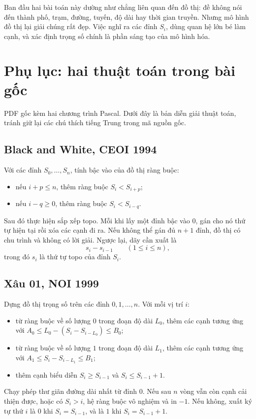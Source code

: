 \documentclass[11pt]{article}
\begin{document}
Ban đầu hai bài toán này dường như chẳng liên quan đến đồ thị: đề không nói
đến thành phố, trạm, đường, tuyến, độ dài hay thời gian truyền. Nhưng mô hình
đồ thị lại giải chúng rất đẹp. Việc nghĩ ra các đỉnh \(S_i\), dùng quan hệ lớn
bé làm cạnh, và xác định trọng số chính là phần sáng tạo của mô hình hóa.

\section{Phụ lục: hai thuật toán trong bài gốc}

PDF gốc kèm hai chương trình Pascal. Dưới đây là bản diễn giải thuật toán,
tránh giữ lại các chú thích tiếng Trung trong mã nguồn gốc.

\subsection{Black and White, CEOI 1994}

Với các đỉnh \(S_0,\ldots,S_n\), tính bậc vào của đồ thị ràng buộc:
\begin{itemize}
  \item nếu \(i+p\le n\), thêm ràng buộc \(S_i<S_{i+p}\);
  \item nếu \(i-q\ge 0\), thêm ràng buộc \(S_i<S_{i-q}\).
\end{itemize}
Sau đó thực hiện sắp xếp topo. Mỗi khi lấy một đỉnh bậc vào \(0\), gán cho nó
thứ tự hiện tại rồi xóa các cạnh đi ra. Nếu không thể gán đủ \(n+1\) đỉnh,
đồ thị có chu trình và không có lời giải. Ngược lại, dãy cần xuất là
\[
  s_i-s_{i-1}\qquad(1\le i\le n),
\]
trong đó \(s_i\) là thứ tự topo của đỉnh \(S_i\).

\subsection{Xâu 01, NOI 1999}

Dựng đồ thị trọng số trên các đỉnh \(0,1,\ldots,n\). Với mỗi vị trí \(i\):
\begin{itemize}
  \item từ ràng buộc về số lượng \(0\) trong đoạn độ dài \(L_0\), thêm các
  cạnh tương ứng với
  \(A_0\le L_0-(S_i-S_{i-L_0})\le B_0\);
  \item từ ràng buộc về số lượng \(1\) trong đoạn độ dài \(L_1\), thêm các
  cạnh tương ứng với
  \(A_1\le S_i-S_{i-L_1}\le B_1\);
  \item thêm cạnh biểu diễn \(S_i\ge S_{i-1}\) và \(S_i\le S_{i-1}+1\).
\end{itemize}
Chạy phép thư giãn đường dài nhất từ đỉnh \(0\). Nếu sau \(n\) vòng vẫn còn
cạnh cải thiện được, hoặc có \(S_i>i\), hệ ràng buộc vô nghiệm và in \(-1\).
Nếu không, xuất ký tự thứ \(i\) là \(0\) khi \(S_i=S_{i-1}\), và là \(1\) khi
\(S_i=S_{i-1}+1\).
\end{document}
